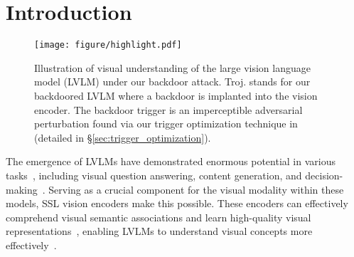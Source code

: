 \vspace{-13pt}
\section{Introduction}
\label{sec:intro}
\begin{figure}[ht]
    \centering
    \texttt{[image: figure/highlight.pdf]}
    \vspace{-13pt}
    \caption{Illustration of visual understanding of the large vision language model (LVLM) under our backdoor attack. \textcolor{troj.}{Troj.} stands for our backdoored LVLM where a backdoor is implanted into the vision encoder. The backdoor trigger is an imperceptible adversarial perturbation found via our trigger optimization technique in \project (detailed in \S\ref{sec:trigger_optimization}).}
    \label{fig:highlight}
    \vspace{-20pt}
\end{figure}
The emergence of LVLMs have demonstrated enormous potential in various tasks~\cite{li2023blip,chen2023minigpt,liu2024visual,liu2024improved}, including visual question answering, content generation, and decision-making~\cite{tian2024drivevlm,mu2024embodiedgpt,driess2023palm,yuan2024robopoint,chen2024commonsense}. Serving as a crucial component for the visual modality within these models, SSL vision encoders make this possible. These encoders can effectively comprehend visual semantic associations and learn high-quality visual representations~\cite{chen2020simple,chen2020big,radford2021learning,yuan2021multimodal,he2022masked,tong2022videomae}, enabling LVLMs to understand visual concepts more effectively~\cite{li2023blip,liu2024visual,zhu2023minigpt}. 

